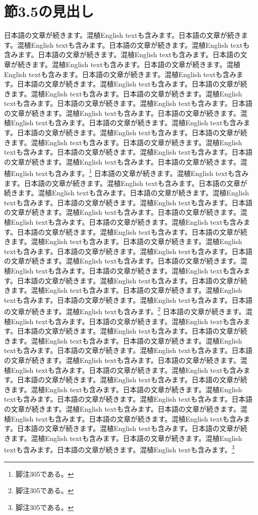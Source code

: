 \documentclass[pdflatex,book]{jlreq}
\begin{document}
\section{節3.5の見出し}
日本語の文章が続きます。混植English textも含みます。日本語の文章が続きます。混植English textも含みます。日本語の文章が続きます。混植English textも含みます。日本語の文章が続きます。混植English textも含みます。日本語の文章が続きます。混植English textも含みます。日本語の文章が続きます。混植English textも含みます。日本語の文章が続きます。混植English textも含みます。日本語の文章が続きます。混植English textも含みます。日本語の文章が続きます。混植English textも含みます。日本語の文章が続きます。混植English textも含みます。日本語の文章が続きます。混植English textも含みます。日本語の文章が続きます。混植English textも含みます。日本語の文章が続きます。混植English textも含みます。日本語の文章が続きます。混植English textも含みます。日本語の文章が続きます。混植English textも含みます。日本語の文章が続きます。混植English textも含みます。日本語の文章が続きます。混植English textも含みます。日本語の文章が続きます。混植English textも含みます。日本語の文章が続きます。混植English textも含みます。日本語の文章が続きます。混植English textも含みます。\footnote{脚注305である。}
日本語の文章が続きます。混植English textも含みます。日本語の文章が続きます。混植English textも含みます。日本語の文章が続きます。混植English textも含みます。日本語の文章が続きます。混植English textも含みます。日本語の文章が続きます。混植English textも含みます。日本語の文章が続きます。混植English textも含みます。日本語の文章が続きます。混植English textも含みます。日本語の文章が続きます。混植English textも含みます。日本語の文章が続きます。混植English textも含みます。日本語の文章が続きます。混植English textも含みます。日本語の文章が続きます。混植English textも含みます。日本語の文章が続きます。混植English textも含みます。日本語の文章が続きます。混植English textも含みます。日本語の文章が続きます。混植English textも含みます。日本語の文章が続きます。混植English textも含みます。日本語の文章が続きます。混植English textも含みます。日本語の文章が続きます。混植English textも含みます。日本語の文章が続きます。混植English textも含みます。日本語の文章が続きます。混植English textも含みます。日本語の文章が続きます。混植English textも含みます。\footnote{脚注305である。}
日本語の文章が続きます。混植English textも含みます。日本語の文章が続きます。混植English textも含みます。日本語の文章が続きます。混植English textも含みます。日本語の文章が続きます。混植English textも含みます。日本語の文章が続きます。混植English textも含みます。日本語の文章が続きます。混植English textも含みます。日本語の文章が続きます。混植English textも含みます。日本語の文章が続きます。混植English textも含みます。日本語の文章が続きます。混植English textも含みます。日本語の文章が続きます。混植English textも含みます。日本語の文章が続きます。混植English textも含みます。日本語の文章が続きます。混植English textも含みます。日本語の文章が続きます。混植English textも含みます。日本語の文章が続きます。混植English textも含みます。日本語の文章が続きます。混植English textも含みます。日本語の文章が続きます。混植English textも含みます。日本語の文章が続きます。混植English textも含みます。日本語の文章が続きます。混植English textも含みます。日本語の文章が続きます。混植English textも含みます。日本語の文章が続きます。混植English textも含みます。\footnote{脚注305である。}
\end{document}
